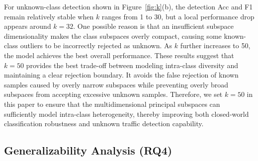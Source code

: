 \documentclass{SCIS2026}
\begin{document}
For unknown-class detection shown in Figure~\ref{fig:k}(b), the detection Acc and F1 remain relatively stable when $k$ ranges from 1 to 30, but a local performance drop appears around $k=32$. One possible reason is that an insufficient subspace dimensionality makes the class subspaces overly compact, causing some known-class outliers to be incorrectly rejected as unknown. As $k$ further increases to 50, the model achieves the best overall performance. These results suggest that $k=50$ provides the best trade-off between modeling intra-class diversity and maintaining a clear rejection boundary. It avoids the false rejection of known samples caused by overly narrow subspaces while preventing overly broad subspaces from accepting excessive unknown samples. Therefore, we set $k=50$ in this paper to ensure that the multidimensional principal subspaces can sufficiently model intra-class heterogeneity, thereby improving both closed-world classification robustness and unknown traffic detection capability.




\subsection{Generalizability Analysis (RQ4)}
\end{document}
